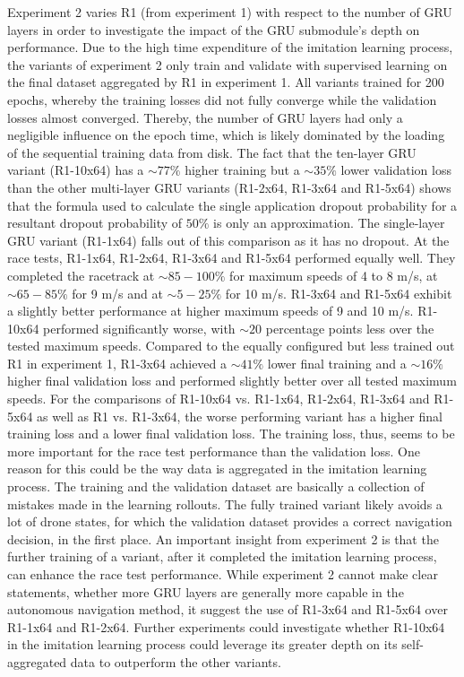 Experiment 2 varies R1 (from experiment 1)
with respect to the number of GRU layers 
in order to investigate
the impact of the GRU submodule's depth on performance.
Due to the high time expenditure of the imitation learning process,
the variants of experiment 2 
only train and validate with supervised learning 
on the final dataset aggregated by R1 in experiment 1.
All variants trained for 200 epochs,
whereby the training losses did not fully converge
while the validation losses almost converged.
Thereby, the number of GRU layers had only a negligible influence on the epoch time,
which is likely dominated by the loading of the sequential training data from disk.
The fact that the ten-layer GRU variant (R1-10x64)
has a $\sim 77 \%$ higher training
but a $\sim 35 \%$ lower validation loss 
than the other multi-layer GRU variants (R1-2x64, R1-3x64 and R1-5x64)
shows that the formula used to calculate the single application dropout probability
for a resultant dropout probability of $50 \%$ is only an approximation.
The single-layer GRU variant (R1-1x64) falls out of this comparison as it has no dropout.
At the race tests, R1-1x64, R1-2x64, R1-3x64 and R1-5x64 performed equally well.
They completed the racetrack at $\sim 85 - 100 \%$ for maximum speeds of 4 to 8 m/s,
at $\sim 65 - 85 \%$ for 9 m/s 
and at $\sim 5 - 25 \%$ for 10 m/s.
R1-3x64 and R1-5x64 exhibit a slightly better performance at higher maximum speeds of 9 and 10 m/s.
R1-10x64 performed significantly worse, 
with $\sim 20$ percentage points less over the tested maximum speeds.
Compared to the equally configured but less trained out R1 in experiment 1,
R1-3x64 achieved a $\sim 41 \%$ lower final training
and a $\sim 16 \%$ higher final validation loss
and performed slightly better over all tested maximum speeds.
For the comparisons of R1-10x64 vs. R1-1x64, R1-2x64, R1-3x64 and R1-5x64
as well as R1 vs. R1-3x64,
the worse performing variant has a higher final training loss and a lower final validation loss.
The training loss, thus, seems to be more important for the race test performance than the validation loss.
One reason for this could be the way data is aggregated in the imitation learning process.
The training and the validation dataset are basically a collection of mistakes made in the learning rollouts.
The fully trained variant likely avoids a lot of drone states, 
for which the validation dataset provides a correct navigation decision,
in the first place.
An important insight from experiment 2 is that 
the further training of a variant, after it completed the imitation learning process,
can enhance the race test performance.
While experiment 2 cannot make clear statements,
whether more GRU layers are generally more capable in the autonomous navigation method,
it suggest the use of R1-3x64 and R1-5x64 over R1-1x64 and R1-2x64.
Further experiments could investigate
whether R1-10x64 in the imitation learning process
could leverage its greater depth on its self-aggregated data
to outperform the other variants.



